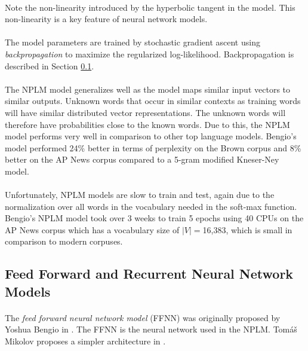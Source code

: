 \paragraph{}
Note the non-linearity introduced by the hyperbolic tangent in the model. This non-linearity is a key feature of neural network models.
\paragraph{}
The model parameters are trained by stochastic gradient ascent using \emph{backpropagation} to maximize the regularized log-likelihood. Backpropagation is described in Section \ref{sec:FFNNRNN}.
\paragraph{}
The NPLM model generalizes well as the model maps similar input vectors to similar outputs. Unknown words that occur in similar contexts as training words will have similar distributed vector representations. The unknown words will therefore have probabilities close to the known words.  Due to this, the NPLM model performs very well in comparison to other top language models. Bengio's model performed 24\% better in terms of perplexity on the Brown corpus and 8\% better on the AP News corpus compared to a 5-gram modified Kneser-Ney model.
\paragraph{}
Unfortunately, NPLM models are slow to train and test, again due to the normalization over all words in the vocabulary needed in the soft-max function. Bengio's NPLM model took over 3 weeks to train 5 epochs using 40 CPUs on the AP News corpus which has a vocabulary size of $|V|=$16,383, which is small in comparison to modern corpuses.

\subsection{Feed Forward and Recurrent Neural Network Models} \label{sec:FFNNRNN}
\paragraph{}
The \emph{feed forward neural network model} (FFNN) was originally proposed by Yoshua Bengio in \cite{Bengio2003}. The FFNN is the neural network used in the NPLM. Tom{\'a}\v{s} Mikolov proposes a simpler architecture in \cite{Mikolov2009}.

